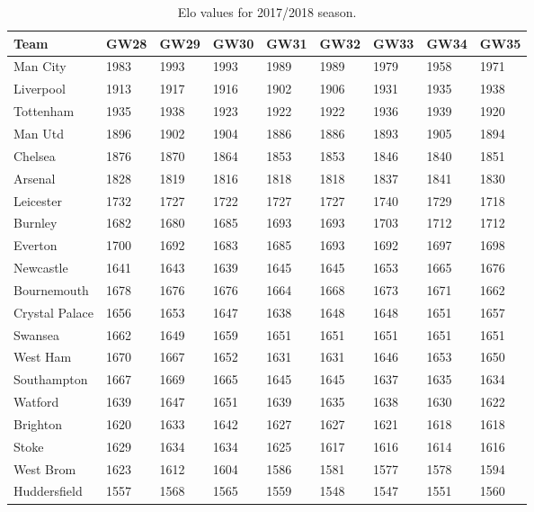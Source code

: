 \begin{table}[H]
\centering
\smaller
\begin{tabular}{|l|l|l|l|l|l|l|l|l|}
\hline
Team           & GW28 & GW29 & GW30 & GW31 & GW32 & GW33 & GW34 & GW35 \\
\hline
Man City       & 1983 & 1993 & 1993 & 1989 & 1989 & 1979 & 1958 & 1971 \\
Liverpool      & 1913 & 1917 & 1916 & 1902 & 1906 & 1931 & 1935 & 1938 \\
Tottenham      & 1935 & 1938 & 1923 & 1922 & 1922 & 1936 & 1939 & 1920 \\
Man Utd        & 1896 & 1902 & 1904 & 1886 & 1886 & 1893 & 1905 & 1894 \\
Chelsea        & 1876 & 1870 & 1864 & 1853 & 1853 & 1846 & 1840 & 1851 \\
Arsenal        & 1828 & 1819 & 1816 & 1818 & 1818 & 1837 & 1841 & 1830 \\
Leicester      & 1732 & 1727 & 1722 & 1727 & 1727 & 1740 & 1729 & 1718 \\
Burnley        & 1682 & 1680 & 1685 & 1693 & 1693 & 1703 & 1712 & 1712 \\
Everton        & 1700 & 1692 & 1683 & 1685 & 1693 & 1692 & 1697 & 1698 \\
Newcastle      & 1641 & 1643 & 1639 & 1645 & 1645 & 1653 & 1665 & 1676 \\
Bournemouth    & 1678 & 1676 & 1676 & 1664 & 1668 & 1673 & 1671 & 1662 \\
Crystal Palace & 1656 & 1653 & 1647 & 1638 & 1648 & 1648 & 1651 & 1657 \\
Swansea        & 1662 & 1649 & 1659 & 1651 & 1651 & 1651 & 1651 & 1651 \\
West Ham       & 1670 & 1667 & 1652 & 1631 & 1631 & 1646 & 1653 & 1650 \\
Southampton    & 1667 & 1669 & 1665 & 1645 & 1645 & 1637 & 1635 & 1634 \\
Watford        & 1639 & 1647 & 1651 & 1639 & 1635 & 1638 & 1630 & 1622 \\
Brighton       & 1620 & 1633 & 1642 & 1627 & 1627 & 1621 & 1618 & 1618 \\
Stoke          & 1629 & 1634 & 1634 & 1625 & 1617 & 1616 & 1614 & 1616 \\
West Brom      & 1623 & 1612 & 1604 & 1586 & 1581 & 1577 & 1578 & 1594 \\
Huddersfield   & 1557 & 1568 & 1565 & 1559 & 1548 & 1547 & 1551 & 1560 \\
\hline
\end{tabular}
\caption{Elo values for 2017/2018 season.}
\label{tab:elo_values_gameweeks_4}
\end{table}